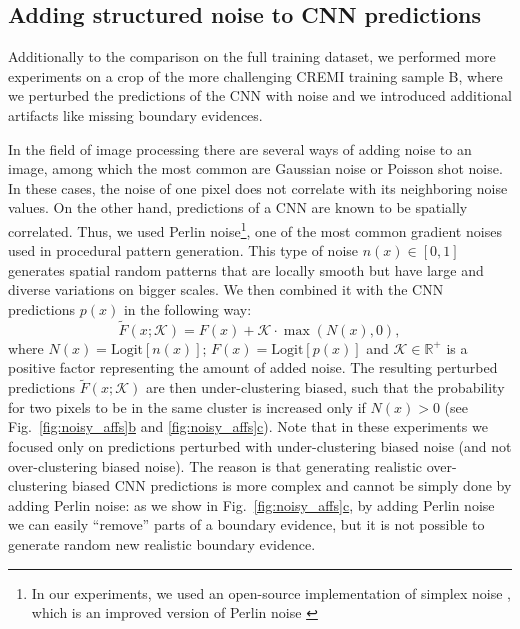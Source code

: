 \subsection{Adding structured noise to CNN predictions} \label{sec:appendix_noise_gen}
Additionally to the comparison on the full training dataset, we performed more experiments on a crop of the more challenging CREMI training sample B, where we perturbed the predictions of the CNN with noise and we introduced additional artifacts like missing boundary evidences.

In the field of image processing there are several ways of adding noise to an image, among which the most common are Gaussian noise or Poisson shot noise. 
In these cases, the noise of one pixel does not correlate with its neighboring noise values. On the other hand, predictions of a CNN are known to be spatially correlated. 
Thus, we used Perlin noise\footnote{In our experiments, we used an open-source implementation of simplex noise \cite{perlin2001noise}, which is an improved version of Perlin noise \cite{perlin1985image}}, one of the most common gradient noises used in procedural pattern generation. This type of noise $n(x)\in[0,1]$ generates spatial random patterns that are locally smooth but have large and diverse variations on bigger scales. We then combined it with the CNN predictions $p(x)$ in the following way:
\begin{equation}\label{eq:noise_biased_predictions}
\tilde{F}(x;\mathcal{K})=F(x)+\mathcal{K}\cdot\max\left(N(x),0\right),
\end{equation}
where  $N(x)=\mathrm{Logit}[n(x)]$; $F(x)=\mathrm{Logit}[p(x)]$ and $\mathcal{K}\in \mathbb{R}^+$ is a positive factor representing the amount of added noise. The resulting perturbed predictions $\tilde{F}(x;\mathcal{K})$ are then under-clustering biased, such that the probability for two pixels to be in the same cluster is increased only if $N(x)>0$ (see Fig.~\hyperref[fig:noisy_affs]{\ref*{fig:noisy_affs}b} and \hyperref[fig:noisy_affs]{\ref*{fig:noisy_affs}c}). 
Note that in these experiments we focused only on predictions perturbed with under-clustering biased noise (and not over-clustering biased noise). The reason is that generating realistic over-clustering biased CNN predictions is more complex and cannot be simply done by adding Perlin noise: as we show in Fig.~\hyperref[fig:noisy_affs]{\ref*{fig:noisy_affs}c}, by adding Perlin noise we can easily ``remove'' parts of a boundary evidence, but it is not possible to generate random new realistic boundary evidence.  

